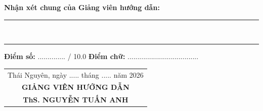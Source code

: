 \vspace{4mm}
\noindent \textbf{Nhận xét chung của Giảng viên hướng dẫn:} \\
\noindent \rule{\textwidth}{0.4pt} \\
\noindent \rule{\textwidth}{0.4pt}

\vspace{3mm}
\noindent \textbf{Điểm số:} .............. / 10.0 \hfill \textbf{Điểm chữ:} ....................................

\vspace{8mm}
\hfill
\begin{tabular}{c}
Thái Nguyên, ngày ..... tháng ..... năm 2026 \\
\textbf{GIẢNG VIÊN HƯỚNG DẪN} \\[2.5cm]
\textbf{ThS. NGUYỄN TUẤN ANH}
\end{tabular}
